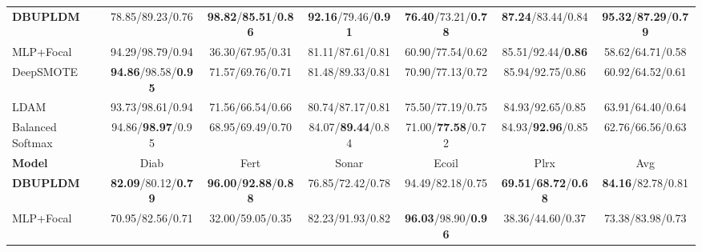 \documentclass[a4paper]{cas-sc}
\begin{document}
\begin{table}[htbp]
{\begin{tabular}{lcccccc}
    \midrule
    \textbf{DBUPLDM} & 78.85/89.23/0.76 & \textbf{98.82}/\textbf{85.51}/\textbf{0.86} & \textbf{92.16}/79.46/\textbf{0.91} & \textbf{76.40}/73.21/\textbf{0.78} & \textbf{87.24}/83.44/0.84 & \textbf{95.32}/\textbf{87.29}/\textbf{0.79} \\
    MLP+Focal        & {\color{red}94.29}/{\color{red}98.79}/{\color{red}0.94} & {\color{red}36.30}/{\color{red}67.95}/{\color{red}0.31} & {\color{red}81.11}/{\color{red}87.61}/{\color{red}0.81} & {\color{red}60.90}/{\color{red}77.54}/{\color{red}0.62} & {\color{red}85.51}/{\color{red}92.44}/\textbf{\color{red}0.86} & {\color{red}58.62}/{\color{red}64.71}/{\color{red}0.58} \\
    DeepSMOTE        & \textbf{\color{red}94.86}/{\color{red}98.58}/\textbf{\color{red}0.95} & {\color{red}71.57}/{\color{red}69.76}/{\color{red}0.71} & {\color{red}81.48}/{\color{red}89.33}/{\color{red}0.81} & {\color{red}70.90}/{\color{red}77.13}/{\color{red}0.72} & {\color{red}85.94}/{\color{red}92.75}/{\color{red}0.86} & {\color{red}60.92}/{\color{red}64.52}/{\color{red}0.61} \\
    LDAM             & {\color{red}93.73}/{\color{red}98.61}/{\color{red}0.94} & {\color{red}71.56}/{\color{red}66.54}/{\color{red}0.66} & {\color{red}80.74}/{\color{red}87.17}/{\color{red}0.81} & {\color{red}75.50}/{\color{red}77.19}/{\color{red}0.75} & {\color{red}84.93}/{\color{red}92.65}/{\color{red}0.85} & {\color{red}63.91}/{\color{red}64.40}/{\color{red}0.64} \\
    Balanced Softmax & {\color{red}94.86}/\textbf{\color{red}98.97}/{\color{red}0.95} & {\color{red}68.95}/{\color{red}69.49}/{\color{red}0.70} & {\color{red}84.07}/\textbf{\color{red}89.44}/{\color{red}0.84} & {\color{red}71.00}/\textbf{\color{red}77.58}/{\color{red}0.72} & {\color{red}84.93}/\textbf{\color{red}92.96}/{\color{red}0.85} & {\color{red}62.76}/{\color{red}66.56}/{\color{red}0.63} \\
    \midrule
    \textbf{Model} & Diab & Fert & Sonar & Ecoil & Plrx & Avg \\
    \midrule
    \textbf{DBUPLDM} & \textbf{82.09}/80.12/\textbf{0.79} & \textbf{96.00}/\textbf{92.88}/\textbf{0.88} & 76.85/72.42/0.78 & 94.49/82.18/0.75 & \textbf{69.51}/\textbf{68.72}/\textbf{0.68} & \textbf{84.16}/82.78/0.81 \\
    MLP+Focal        & {\color{red}70.95}/{\color{red}82.56}/{\color{red}0.71} & {\color{red}32.00}/{\color{red}59.05}/{\color{red}0.35} & {\color{red}82.23}/{\color{red}91.93}/{\color{red}0.82} & \textbf{\color{red}96.03}/{\color{red}98.90}/\textbf{\color{red}0.96} & {\color{red}38.36}/{\color{red}44.60}/{\color{red}0.37} & {\color{red}73.38}/{\color{red}83.98}/{\color{red}0.73} \\

\end{tabular}}
\end{table}
\end{document}
